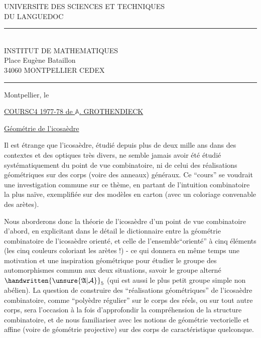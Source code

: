 \noindent\begin{minipage}[t]{0.57\linewidth}
\centering\rmfamily
UNIVERSITE DES SCIENCES ET TECHNIQUES\\
DU LANGUEDOC\\
\rule{0.55cm}{0.4pt}\\
\sffamily
INSTITUT DE MATHEMATIQUES\\
Place Eugène Bataillon\\
34060 MONTPELLIER CEDEX\\
\rule{0.65cm}{0.4pt}
\end{minipage}\hfill
\begin{minipage}[t]{0.37\linewidth}
Montpellier, le
\end{minipage}

\begin{center}
\setlength{\ULdepth}{1.45\baselineskip}
\uline{COURS\quad C4 1977-78 de $\mathbb A$. GROTHENDIECK}\par\vspace{.6\baselineskip}
\end{center}

\uline{Géométrie de l'icosaèdre}

Il est étrange que l'icosaèdre, étudié depuis plus de deux mille ans dans des contextes et des optiques très divers, ne semble jamais avoir été étudié systématiquement du point de vue combinatoire, ni de celui des réalisations géométriques sur des corps (voire des anneaux) généraux. Ce ``cours'' se voudrait une investigation commune sur ce thème, en partant de l'intuition combinatoire la plus naïve, exemplifiée sur des modèles en carton (avec un coloriage convenable des arètes).

Nous aborderons donc la théorie de l'icosaèdre d'un point de vue combinatoire d'abord, en explicitant dans le détail le dictionnaire entre la géométrie combinatoire de l'icosaèdre orienté, et celle de l'ensemble``orienté'' à cinq éléments (les cinq couleurs coloriant les arètes !) - ce qui donnera en même temps une motivation et une inspiration géométrique pour étudier le groupe des automorphismes commun aux deux situations, savoir le groupe alterné%
%
 $\handwritten{\unsure{\mathfrak A|\mathcal A}}_5$ (qui est aussi le plus petit groupe simple non abélien). La question de construire des ``réalisations géométriques'' de l'icosaèdre combinatoire, comme ``polyèdre régulier'' sur le corps des réels, ou sur tout autre corps, sera l'occasion à la fois d'approfondir la compréhension de la structure combinatoire, et de nous familiariser avec les notions de géométrie vectorielle et affine (voire de géométrie projective) sur des corps de caractéristique quelconque.

